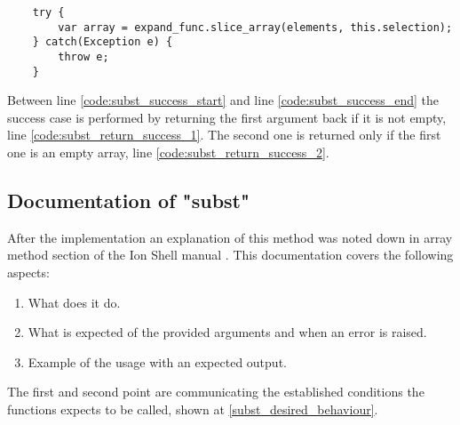 \begin{verbatim}
	try {
		var array = expand_func.slice_array(elements, this.selection);
	} catch(Exception e) {
		throw e;
	}
\end{verbatim}

Between line \ref{code:subst_success_start} and line \ref{code:subst_success_end} the success case is performed by returning the first argument back if it is not empty, line \ref{code:subst_return_success_1}.
The second one is returned only if the first one is an empty array, line \ref{code:subst_return_success_2}.


\subsection{Documentation of "subst"}

After the implementation an explanation of this method was noted down in array method section of the Ion Shell manual \cite{ion_manual_array_methods}.
This documentation covers the following aspects:
\begin{enumerate}
	\item What does it do.
	\item What is expected of the provided arguments and when an error is raised.
	\item Example of the usage with an expected output.
\end{enumerate}

The first and second point are communicating the established conditions the functions expects to be called, shown at \ref{subst_desired_behaviour}.


